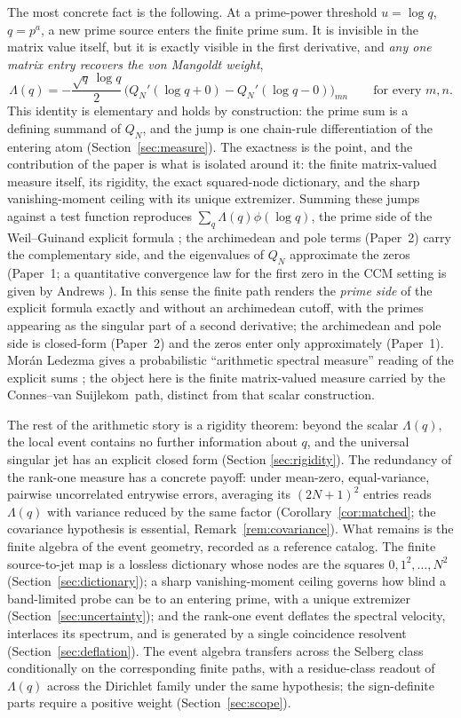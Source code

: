 \documentclass[11pt]{article}
\theoremstyle{plain}
\theoremstyle{definition}
\theoremstyle{remark}
\newcommand{\cvs}{Connes--van Suijlekom}
\newcommand{\Lam}{\Lambda}
\begin{document}
The most concrete fact is the following. At a prime-power threshold $u=\log q$,
$q=p^{a}$, a new prime source enters the finite prime sum. It is invisible in
the matrix value itself, but it is exactly visible in the first derivative, and
\emph{any one matrix entry recovers the von Mangoldt weight},
\[
        \Lam(q)=-\frac{\sqrt q\,\log q}{2}\,
        \bigl(Q_N'(\log q+0)-Q_N'(\log q-0)\bigr)_{mn}
        \qquad\text{for every }m,n.
\]
This identity is elementary and holds by construction: the prime sum is a
defining summand of $Q_N$, and the jump is one chain-rule differentiation of
the entering atom (Section~\ref{sec:measure}). The exactness is the point, and
the contribution of the paper is what is isolated around it: the finite
matrix-valued measure itself, its rigidity, the exact squared-node dictionary,
and the sharp vanishing-moment ceiling with its unique extremizer.
Summing these jumps against a test function reproduces $\sum_{q}\Lam(q)\phi(\log
q)$, the prime side of the Weil--Guinand explicit formula
\cite{Weil1952,IwaniecKowalski2004}; the archimedean and pole terms
(Paper~2) carry the complementary side, and the eigenvalues of $Q_N$
approximate the zeros (Paper~1; a quantitative convergence law for the first
zero in the CCM setting is given by Andrews \cite{Andrews2026}). In this sense the finite path renders the
\emph{prime side} of the explicit formula exactly and without an archimedean
cutoff, with the primes appearing as the singular part of a second derivative;
the archimedean and pole side is closed-form (Paper~2) and the zeros enter only
approximately (Paper~1). Morán Ledezma gives a
probabilistic ``arithmetic spectral measure'' reading of the explicit sums
\cite{MoranLedezma2023}; the object here is the finite matrix-valued measure
carried by the \cvs\ path, distinct from that scalar construction.

The rest of the arithmetic story is a rigidity theorem: beyond the scalar
$\Lam(q)$, the local event contains no further information about $q$, and the
universal singular jet has an explicit closed form (Section
\ref{sec:rigidity}). The redundancy of the rank-one measure has a concrete
payoff: under mean-zero, equal-variance, pairwise uncorrelated entrywise
errors, averaging its $(2N+1)^2$
entries reads $\Lam(q)$ with variance reduced by
the same factor (Corollary~\ref{cor:matched}; the covariance hypothesis is
essential, Remark~\ref{rem:covariance}). What remains is the finite algebra of
the event geometry, recorded as a reference catalog. The
finite source-to-jet map is a lossless dictionary whose nodes are the squares
$0,1^{2},\dots,N^{2}$ (Section~\ref{sec:dictionary}); a sharp vanishing-moment
ceiling governs how blind a band-limited probe can be to an entering prime,
with a unique extremizer (Section~\ref{sec:uncertainty}); and the rank-one
event deflates the spectral velocity, interlaces its spectrum, and is generated
by a single coincidence resolvent (Section~\ref{sec:deflation}). The event
algebra transfers across the Selberg class conditionally on the corresponding
finite paths, with a residue-class readout of
$\Lam(q)$ across the Dirichlet family under the same hypothesis; the
sign-definite parts require a positive
weight (Section~\ref{sec:scope}).
\end{document}
